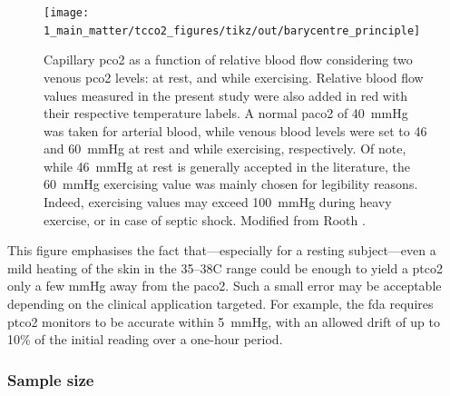 \begin{figure}
	\centering
	\texttt{[image: 1\_main\_matter/tcco2\_figures/tikz/out/barycentre\_principle]}
	\caption[Capillary \gls{pco2} as a function of relative blood flow considering two venous \gls{pco2} levels: at rest, and while exercising.]{Capillary \gls{pco2} as a function of relative blood flow considering two venous \gls{pco2} levels: at rest, and while exercising. Relative blood flow values measured in the present study were also added in red with their respective temperature labels. A normal \gls{paco2} of 40~mmHg\cite{schneider2013} was taken for arterial blood, while venous blood levels were set to 46 and 60~mmHg at rest and while exercising, respectively. Of note, while 46~mmHg at rest is generally accepted in the literature\cite{byrne2014}, the 60~mmHg exercising value was mainly chosen for legibility reasons. Indeed, exercising values may exceed 100~mmHg during heavy exercise, or in case of septic shock\cite{kowalchuk1988, diaztagle2017}. Modified from Rooth \etal{}\cite{rooth1987}.}\label{fig:tcco2:barycentre_principle}
\end{figure} %

This figure emphasises the fact that---especially for a resting subject---even a mild heating of the skin in the 35--38{\degree}C range could be enough to yield a \gls{ptco2} only a few mmHg away from the \gls{paco2}. Such a small error may be acceptable depending on the clinical application targeted. For example, the \gls{fda} requires \gls{ptco2} monitors to be accurate within 5~mmHg, with an allowed drift of up to 10\% of the initial reading over a one-hour period\cite{fda_transcut}.

\subsubsection{Sample size}\label{subsect:tcco2:sample_size}


